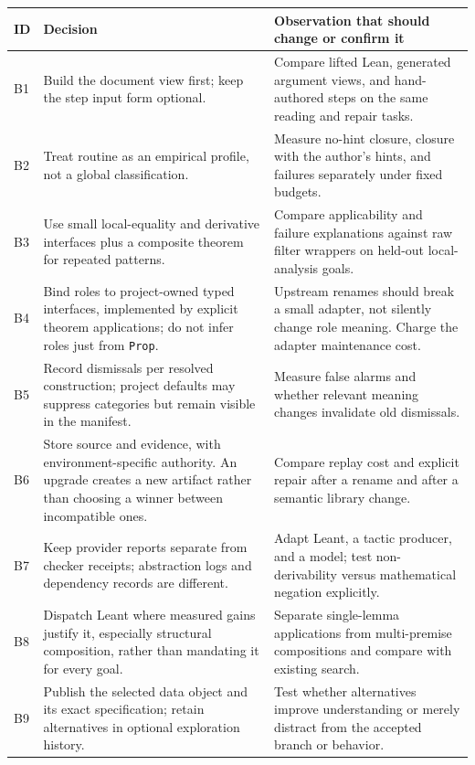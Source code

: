 \documentclass[11pt,letterpaper]{article}
\newcommand{\code}[1]{\nolinkurl{#1}}
\numberwithin{equation}{section}
\begin{document}
\begin{longtable}{@{}P{.07\textwidth}P{.39\textwidth}P{.46\textwidth}@{}}
\toprule
ID & Decision & Observation that should change or confirm it\\
\midrule
\endhead
B1 & Build the document view first; keep the step input form optional. & Compare
lifted Lean, generated argument views, and hand-authored steps on the same
reading and repair tasks.\\
B2 & Treat routine as an empirical profile, not a global classification. & Measure
no-hint closure, closure with the author's hints, and failures separately under
fixed budgets.\\
B3 & Use small local-equality and derivative interfaces plus a composite theorem
for repeated patterns. & Compare applicability and failure explanations against
raw filter wrappers on held-out local-analysis goals.\\
B4 & Bind roles to project-owned typed interfaces, implemented by explicit theorem
applications; do not infer roles just from \code{Prop}. & Upstream renames should
break a small adapter, not silently change role meaning. Charge the adapter
maintenance cost.\\
B5 & Record dismissals per resolved construction; project defaults may suppress
categories but remain visible in the manifest. & Measure false alarms and
whether relevant meaning changes invalidate old dismissals.\\
B6 & Store source and evidence, with environment-specific authority. An upgrade
creates a new artifact rather than choosing a winner between incompatible ones.
& Compare replay cost and explicit repair after a rename and after a semantic
library change.\\
B7 & Keep provider reports separate from checker receipts; abstraction logs and
dependency records are different. & Adapt Leant, a tactic producer, and a model;
test non-derivability versus mathematical negation explicitly.\\
B8 & Dispatch Leant where measured gains justify it, especially structural
composition, rather than mandating it for every goal. & Separate single-lemma
applications from multi-premise compositions and compare with existing search.\\
B9 & Publish the selected data object and its exact specification; retain
alternatives in optional exploration history. & Test whether alternatives improve
understanding or merely distract from the accepted branch or behavior.\\

\end{longtable}
\end{document}
